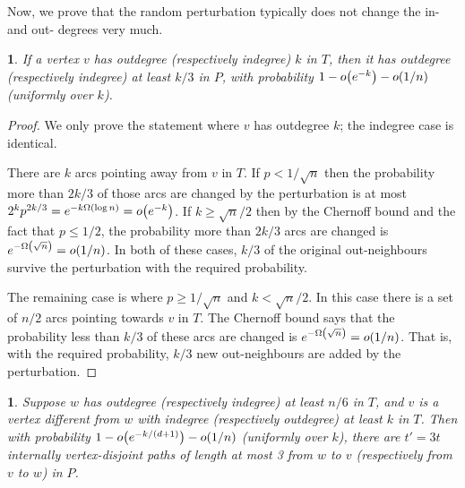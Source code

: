 \documentclass[11pt,english]{article}
\theoremstyle{plain}
\theoremstyle{definition}
\theoremstyle{definition}
\theoremstyle{plain}
\theoremstyle{plain}
\theoremstyle{plain}
\newtheorem{lem}[thm]{\protect\lemmaname}
\theoremstyle{plain}
\theoremstyle{remark}
\theoremstyle{remark}
\let\originalleft\left
\let\originalright\right
\renewcommand{\left}{\mathopen{}\mathclose\bgroup\originalleft}
\renewcommand{\right}{\aftergroup\egroup\originalright}
\providecommand{\lemmaname}{Lemma}
\begin{document}
Now, we prove that the random perturbation typically does not change
the in- and out- degrees very much. 
\begin{lem}
\label{lem:preserve-degree}If a vertex $v$ has outdegree (respectively
indegree) $k$ in $T$, then it has outdegree (respectively indegree)
at least $k/3$ in $P$, with probability $1-o\left(e^{-k}\right)-o\left(1/n\right)$
(uniformly over $k$).\end{lem}
\begin{proof}
We only prove the statement where $v$ has outdegree $k$; the indegree
case is identical.

There are $k$ arcs pointing away from $v$ in $T$. If $p<1/\sqrt{n}$ then the probability more than  $2k/3$ of those arcs are changed by the perturbation is at most $2^kp^{2k/3}=e^{-k\Omega\left(\log n\right)}=o\left(e^{-k}\right)$. If $k\ge\sqrt{n}/2$ then by the Chernoff bound and the fact that $p\le1/2$, the probability more than $2k/3$ arcs are changed is $e^{-\Omega\left(\sqrt{n}\right)}=o\left(1/n\right)$. In both of these cases, $k/3$ of the original out-neighbours survive
the perturbation with the required probability.

The remaining case is where $p\ge1/\sqrt{n}$ and $k<\sqrt{n}/2$.
In this case there is a set of $n/2$ arcs pointing towards $v$ in
$T$. The Chernoff bound says that the probability less than $k/3$
of these arcs are changed is $e^{-\Omega\left(\sqrt{n}\right)}=o\left(1/n\right)$.
That is, with the required probability, $k/3$ new out-neighbours
are added by the perturbation.\end{proof}
\begin{lem}
\label{lem:path-from-home}Suppose $w$ has outdegree (respectively
indegree) at least $n/6$ in $T$, and $v$ is a vertex different
from $w$ with indegree (respectively outdegree) at least $k$ in
$T$. Then with probability $1-o\left(e^{-k/\left(d+1\right)}\right)-o\left(1/n\right)$
(uniformly over $k$), there are $t'=3t$ internally vertex-disjoint
paths of length at most 3 from $w$ to $v$ (respectively from $v$
to $w$) in $P$.\end{lem}
\end{document}
